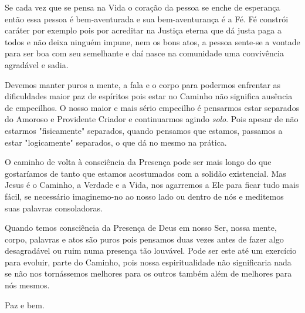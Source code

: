 \emdash{}Se cada vez que se pensa na Vida o coração da pessoa se enche de esperança então essa pessoa é bem-aventurada e sua bem-aventurança é a Fé. Fé constrói caráter por exemplo pois por acreditar na Justiça eterna que dá justa paga a todos e não deixa ninguém impune, nem os bons atos, a pessoa sente-se a vontade para ser boa com seu semelhante e daí nasce na comunidade uma convivência agradável e sadia.

\emdash{}Devemos manter puros a mente, a fala e o corpo para podermos enfrentar as dificuldades maior paz de espíritos pois estar no Caminho não significa ausência de empecilhos. O nosso maior e mais sério empecilho é pensarmos estar separados do Amoroso e Providente Criador e continuarmos agindo \textit{solo}. Pois apesar de não estarmos "fisicamente" separados, quando pensamos que estamos, passamos a estar "logicamente" separados, o que dá no mesmo na prática.

\emdash{}O caminho de volta à consciência da Presença pode ser mais longo do que gostaríamos de tanto que estamos acostumados com a solidão existencial. Mas Jesus é o Caminho, a Verdade e a Vida, nos agarremos a Ele para ficar tudo mais fácil, se necessário imaginemo-no ao nosso lado ou dentro de nós e meditemos suas palavras consoladoras.

\emdash{}Quando temos consciência da Presença de Deus em nosso Ser, nossa mente, corpo, palavras e atos são puros pois pensamos duas vezes antes de fazer algo desagradável ou ruim numa presença tão louvável. Pode ser este até um exercício para evoluir, parte do Caminho, pois nossa espiritualidade não significaria nada se não nos tornássemos melhores para os outros também além de melhores para nós mesmos.

\emdash{}Paz e bem.